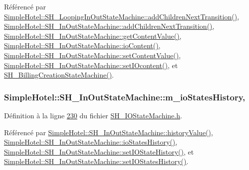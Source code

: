 Référencé par \hyperlink{classSimpleHotel_1_1SH__LoopingInOutStateMachine_a2ac2ff43d97fd1b12e1b30d6818f33e4}{Simple\-Hotel\-::\-S\-H\-\_\-\-Looping\-In\-Out\-State\-Machine\-::add\-Children\-Next\-Transition()}, \hyperlink{classSimpleHotel_1_1SH__InOutStateMachine_aaf5afe04d6e4d3d5ebf0b5f1b00eddf1}{Simple\-Hotel\-::\-S\-H\-\_\-\-In\-Out\-State\-Machine\-::add\-Children\-Next\-Transition()}, \hyperlink{classSimpleHotel_1_1SH__InOutStateMachine_a4e2afab69163c7ce53dd6a40c793d5dc}{Simple\-Hotel\-::\-S\-H\-\_\-\-In\-Out\-State\-Machine\-::get\-Content\-Value()}, \hyperlink{classSimpleHotel_1_1SH__InOutStateMachine_a378618937520bc65b6e25cd187a92aad}{Simple\-Hotel\-::\-S\-H\-\_\-\-In\-Out\-State\-Machine\-::io\-Content()}, \hyperlink{classSimpleHotel_1_1SH__InOutStateMachine_aaf92da452f6cf7cc57aa9e60f88322e4}{Simple\-Hotel\-::\-S\-H\-\_\-\-In\-Out\-State\-Machine\-::set\-Content\-Value()}, \hyperlink{classSimpleHotel_1_1SH__InOutStateMachine_a60245aa45ba2b9720965412774e123fb}{Simple\-Hotel\-::\-S\-H\-\_\-\-In\-Out\-State\-Machine\-::set\-I\-Ocontent()}, et \hyperlink{classSimpleHotel_1_1SH__BillingCreationStateMachine_a8c7d39e11d0ced1fd9c27a5550465b86}{S\-H\-\_\-\-Billing\-Creation\-State\-Machine()}.

\hypertarget{classSimpleHotel_1_1SH__InOutStateMachine_a45a7defb15e50a196bc471017fc86eb4}{
\subsubsection[{m\-\_\-io\-States\-History}]{\setlength{\rightskip}{0pt plus 5cm}Simple\-Hotel\-::\-S\-H\-\_\-\-In\-Out\-State\-Machine\-::m\-\_\-io\-States\-History\hspace{0.3cm}{\ttfamily [protected]}, {\ttfamily [inherited]}}}\label{classSimpleHotel_1_1SH__InOutStateMachine_a45a7defb15e50a196bc471017fc86eb4}


Définition à la ligne \hyperlink{SH__IOStateMachine_8h_source_l00230}{230} du fichier \hyperlink{SH__IOStateMachine_8h_source}{S\-H\-\_\-\-I\-O\-State\-Machine.\-h}.



Référencé par \hyperlink{classSimpleHotel_1_1SH__InOutStateMachine_af9de98943b9428ed4144bc6695c1ada0}{Simple\-Hotel\-::\-S\-H\-\_\-\-In\-Out\-State\-Machine\-::history\-Value()}, \hyperlink{classSimpleHotel_1_1SH__InOutStateMachine_a0f59a90204a7cbb6835da28cd234978f}{Simple\-Hotel\-::\-S\-H\-\_\-\-In\-Out\-State\-Machine\-::io\-States\-History()}, \hyperlink{classSimpleHotel_1_1SH__InOutStateMachine_a7a6675495f101d29e8eb86df84961795}{Simple\-Hotel\-::\-S\-H\-\_\-\-In\-Out\-State\-Machine\-::set\-I\-O\-State\-History()}, et \hyperlink{classSimpleHotel_1_1SH__InOutStateMachine_a31eb01c590e5d9f6422eacc54d2092da}{Simple\-Hotel\-::\-S\-H\-\_\-\-In\-Out\-State\-Machine\-::set\-I\-O\-States\-History()}.

